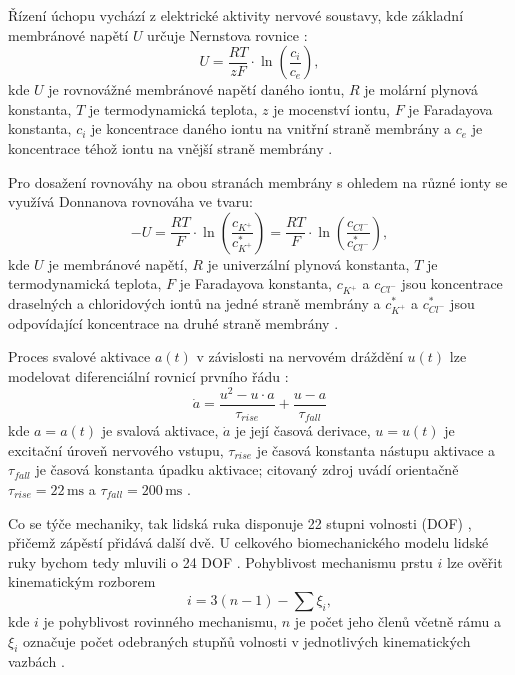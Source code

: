 \documentclass[FZS,DP]{tulthesis}
\begin{document}
Řízení úchopu vychází z elektrické aktivity nervové soustavy, kde základní membránové napětí $U$ určuje Nernstova rovnice \cite{Mornstein2018}:
\begin{equation}
U = \frac{RT}{zF} \cdot \ln\left(\frac{c_i}{c_e}\right),
\end{equation}
kde $U$ je rovnovážné membránové napětí daného iontu, $R$ je molární
plynová konstanta, $T$ je termodynamická teplota, $z$ je mocenství iontu,
$F$ je Faradayova konstanta, $c_i$ je koncentrace daného iontu na vnitřní straně membrány a $c_e$ je koncentrace téhož iontu na vnější straně membrány \cite{Mornstein2018}.

Pro dosažení rovnováhy na obou stranách membrány s ohledem na různé ionty se využívá Donnanova rovnováha \cite{Mornstein2018} ve tvaru:
\begin{equation}
-U = \frac{RT}{F} \cdot \ln\left(\frac{c_{K^+}}{c_{K^+}^*}\right) = \frac{RT}{F} \cdot \ln\left(\frac{c_{Cl^-}}{c_{Cl^-}^*}\right),
\end{equation}
kde $U$ je membránové napětí, $R$ je univerzální plynová konstanta,
$T$ je termodynamická teplota, $F$ je Faradayova konstanta,
$c_{K^+}$ a $c_{Cl^-}$ jsou koncentrace draselných a chloridových iontů
na jedné straně membrány a $c_{K^+}^*$ a $c_{Cl^-}^*$ jsou odpovídající
koncentrace na druhé straně membrány \cite{Mornstein2018}.

Proces svalové aktivace $a(t)$ v závislosti na nervovém dráždění $u(t)$ lze modelovat diferenciální rovnicí prvního řádu \cite{Capek2018}:
\begin{equation}
\dot{a} = \frac{u^2 - u \cdot a}{\tau_{rise}} +
\frac{u - a}{\tau_{fall}}
\end{equation}
kde $a=a(t)$ je svalová aktivace, $\dot{a}$ je její časová derivace,
$u=u(t)$ je excitační úroveň nervového vstupu, $\tau_{rise}$ je časová
konstanta nástupu aktivace a $\tau_{fall}$ je časová konstanta úpadku
aktivace; citovaný zdroj uvádí orientačně $\tau_{rise}=22\,\mathrm{ms}$
a $\tau_{fall}=200\,\mathrm{ms}$ \cite{Capek2018}.

Co se týče mechaniky, tak lidská ruka disponuje 22 stupni volnosti (DOF) \cite{Brazdil2020}, přičemž zápěstí přidává další dvě. U celkového biomechanického modelu lidské ruky bychom tedy mluvili o 24 DOF \cite{Hansen2018}. Pohyblivost mechanismu prstu $i$ lze ověřit kinematickým rozborem 
\begin{equation}
    i = 3(n - 1) - \sum \xi_i ,
\end{equation} 
kde $i$ je pohyblivost rovinného
mechanismu, $n$ je počet jeho členů včetně rámu a $\xi_i$ označuje
počet odebraných stupňů volnosti v jednotlivých kinematických
vazbách \cite{Safran2022}.
\end{document}
